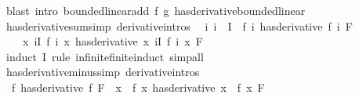 \begin{isabellebody}
\isamarkupfalse%
\ {\isacharparenleft}{\kern0pt}blast\ intro{\isacharcolon}{\kern0pt}\ bounded{\isacharunderscore}{\kern0pt}linear{\isacharunderscore}{\kern0pt}add\ f\ g\ has{\isacharunderscore}{\kern0pt}derivative{\isacharunderscore}{\kern0pt}bounded{\isacharunderscore}{\kern0pt}linear{\isacharparenright}{\kern0pt}%
\endisatagproof
{\isafoldproof}%
%
\isadelimproof
\isanewline
%
\endisadelimproof
\isanewline
{}\isamarkupfalse%
\ has{\isacharunderscore}{\kern0pt}derivative{\isacharunderscore}{\kern0pt}sum{\isacharbrackleft}{\kern0pt}simp{\isacharcomma}{\kern0pt}\ derivative{\isacharunderscore}{\kern0pt}intros{\isacharbrackright}{\kern0pt}{\isacharcolon}{\kern0pt}\isanewline
\ \ {\isachardoublequoteopen}{\isacharparenleft}{\kern0pt}{\isasymAnd}i{\isachardot}{\kern0pt}\ i\ {\isasymin}\ I\ {\isasymLongrightarrow}\ {\isacharparenleft}{\kern0pt}f\ i\ has{\isacharunderscore}{\kern0pt}derivative\ f{\isacharprime}{\kern0pt}\ i{\isacharparenright}{\kern0pt}\ F{\isacharparenright}{\kern0pt}\ {\isasymLongrightarrow}\isanewline
\ \ \ \ {\isacharparenleft}{\kern0pt}{\isacharparenleft}{\kern0pt}{\isasymlambda}x{\isachardot}{\kern0pt}\ {\isasymSum}i{\isasymin}I{\isachardot}{\kern0pt}\ f\ i\ x{\isacharparenright}{\kern0pt}\ has{\isacharunderscore}{\kern0pt}derivative\ {\isacharparenleft}{\kern0pt}{\isasymlambda}x{\isachardot}{\kern0pt}\ {\isasymSum}i{\isasymin}I{\isachardot}{\kern0pt}\ f{\isacharprime}{\kern0pt}\ i\ x{\isacharparenright}{\kern0pt}{\isacharparenright}{\kern0pt}\ F{\isachardoublequoteclose}\isanewline
%
\isadelimproof
\ \ %
\endisadelimproof
%
\isatagproof
{}\isamarkupfalse%
\ {\isacharparenleft}{\kern0pt}induct\ I\ rule{\isacharcolon}{\kern0pt}\ infinite{\isacharunderscore}{\kern0pt}finite{\isacharunderscore}{\kern0pt}induct{\isacharparenright}{\kern0pt}\ simp{\isacharunderscore}{\kern0pt}all%
\endisatagproof
{\isafoldproof}%
%
\isadelimproof
\isanewline
%
\endisadelimproof
\isanewline
{}\isamarkupfalse%
\ has{\isacharunderscore}{\kern0pt}derivative{\isacharunderscore}{\kern0pt}minus{\isacharbrackleft}{\kern0pt}simp{\isacharcomma}{\kern0pt}\ derivative{\isacharunderscore}{\kern0pt}intros{\isacharbrackright}{\kern0pt}{\isacharcolon}{\kern0pt}\isanewline
\ \ {\isachardoublequoteopen}{\isacharparenleft}{\kern0pt}f\ has{\isacharunderscore}{\kern0pt}derivative\ f{\isacharprime}{\kern0pt}{\isacharparenright}{\kern0pt}\ F\ {\isasymLongrightarrow}\ {\isacharparenleft}{\kern0pt}{\isacharparenleft}{\kern0pt}{\isasymlambda}x{\isachardot}{\kern0pt}\ {\isacharminus}{\kern0pt}\ f\ x{\isacharparenright}{\kern0pt}\ has{\isacharunderscore}{\kern0pt}derivative\ {\isacharparenleft}{\kern0pt}{\isasymlambda}x{\isachardot}{\kern0pt}\ {\isacharminus}{\kern0pt}\ f{\isacharprime}{\kern0pt}\ x{\isacharparenright}{\kern0pt}{\isacharparenright}{\kern0pt}\ F{\isachardoublequoteclose}\isanewline

\end{isabellebody}
